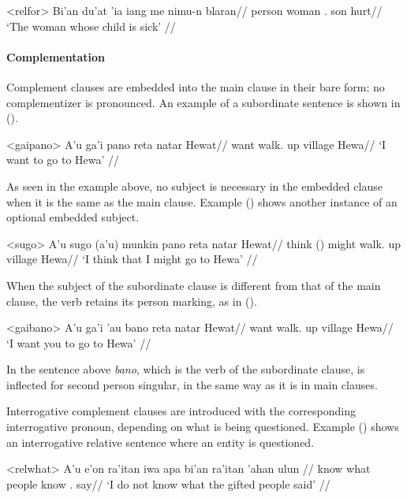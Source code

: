 \documentclass[../hewa_main-subfiles.tex]{subfiles}
\begin{document}
\ex<relfor> %
\begingl %
\gla Bi'an du'at 'ia iang me nimu-n blaran//
\glb person woman \Def{}.\Sg{} \Rel{} son \Third{}\Sg{} hurt//
\glft `The woman whose child is sick' // 
\endgl
\xe

\paragraph{Complementation}

Complement clauses are embedded into the main clause in their bare form; no complementizer is pronounced. An example of a subordinate sentence is shown in ().

\ex<gaipano> %
\begingl %
\gla A'u ga'i pano reta natar Hewat//
\glb \First{}\Sg{} want walk.\First{}\Sg{} up village Hewa//
\glft `I want to go to Hewa' // 
\endgl
\xe

As seen in the example above, no subject is necessary in the embedded clause when it is the same as the main clause. Example () shows another instance of an optional embedded subject.

\ex<sugo> %
\begingl %
\gla A'u sugo (a'u) munkin pano reta natar Hewat//
\glb \First{}\Sg{} think (\First{}\Sg{}) might walk.\First{}\Sg{} up village Hewa//
\glft `I think that I might go to Hewa' // 
\endgl
\xe

When the subject of the subordinate clause is different from that of the main clause, the verb retains its person marking, as in ().

\ex<gaibano> %
\begingl %
\gla A'u ga'i 'au bano reta natar Hewat//
\glb  \First{}\Sg{} want \Second{}\Sg{} walk.\Second{}\Sg{} up village Hewa//
\glft `I want you to go to Hewa' // 
\endgl
\xe

In the sentence above \textit{bano}, which is the verb of the subordinate clause, is inflected for second person singular, in the same way as it is in main clauses.

Interrogative complement clauses are introduced with the corresponding interrogative pronoun, depending on what is being questioned. Example () shows an interrogative relative sentence where an entity is questioned.

\ex<relwhat> %
\begingl %
\gla A'u e'on ra'itan iwa apa bi'an ra'itan 'ahan ulun //
\glb \First{}\Sg{} \Neg{} know \Neg{} what people know \Def{}.\Pl{} say//
\glft `I do not know what the gifted people said' // 
\endgl
\xe
\end{document}
